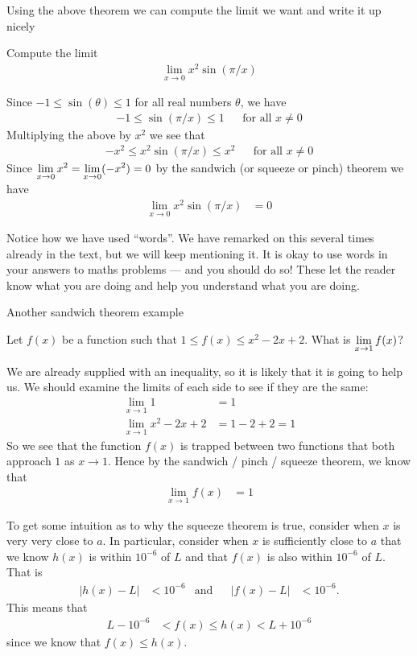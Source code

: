 Using the above theorem we can compute the limit we want and write it up nicely
\begin{eg}\label{eg_1_4_8}
  Compute the limit
\begin{align*}
  \lim_{x \to 0} x^2 \sin(\pi/x)
\end{align*}

  Since $-1 \leq \sin(\theta) \leq 1$ for all real numbers $\theta$, we have
\begin{align*}
  -1 \leq \sin(\pi /x ) \leq 1 && \text{for all $x \neq 0$}
\end{align*}
  Multiplying the above by $x^2$ we see that
\begin{align*}
  -x^2 \leq x^2 \sin(\pi /x ) \leq x^2 && \text{for all $x \neq 0$}
\end{align*}
  Since $\displaystyle \lim_{x \to 0} x^2 = \lim_{x \to 0} (-x^2) = 0$ by the sandwich
(or squeeze or pinch) theorem we have
\begin{align*}
  \lim_{x \to 0} x^2 \sin(\pi/x) &= 0
\end{align*}
\end{eg}
Notice how we have used ``words''. We have remarked on this several times
already in the text, but we will keep mentioning it. It is okay to use words in
your answers to maths problems --- and you should do so! These let the reader
know what you are  doing and help you understand what you are doing.

Another sandwich theorem example
\begin{eg}\label{eg_1_4_9}
Let $f(x)$ be a function such that $1 \leq f(x) \leq x^2-2x+2$. What is
$\displaystyle \lim_{x \to 1} f(x)$?

We are already supplied with an inequality, so it is likely that it is going to
help us. We should examine the limits of each side to see if they are the same:
\begin{align*}
  \lim_{x \to 1} 1 &= 1 \\
  \lim_{x \to 1} x^2-2x+2 &= 1-2+2 = 1
\end{align*}
So we see that the function $f(x)$ is trapped between two functions that both
approach $1$ as $x \to 1$. Hence by the sandwich / pinch / squeeze theorem, we
know that
\begin{align*}
  \lim_{x \to 1} f(x) & =1
\end{align*}
\end{eg}


To get some intuition as to why the squeeze theorem is true, consider when $x$ is very very close to $a$.
In particular, consider when $x$ is sufficiently close to $a$ that we know $h(x)$ is within $10^{-6}$ of $L$
and that $f(x)$ is also within $10^{-6}$ of $L$. That is
\begin{align*}
|h(x)-L| &<10^{-6}  & \text{and}&& |f(x)-L| &<10^{-6}.
\end{align*}
This means that
\begin{align*}
L-10^{-6} &< f(x) \leq h(x) < L+10^{-6}
\end{align*}
since we know that $f(x) \leq h(x)$.

